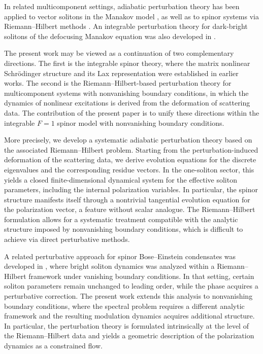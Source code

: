 \documentclass[11pt]{amsart}
\theoremstyle{definition}
\numberwithin{equation}{section}
\begin{document}
In related multicomponent settings, adiabatic perturbation theory has been applied to vector solitons in the Manakov model \cite{Chernyavskiy2025,PhysRevA.109.023328}, as well as to spinor systems via Riemann--Hilbert methods \cite{Rothos2024}. An integrable perturbation theory for dark-bright solitons of the defocusing Manakov equation was also developed in \cite{MylonasRothosKevrekidisFrantzeskakis2016}.

The present work may be viewed as a continuation of two complementary directions. The first is the integrable spinor theory, where the matrix nonlinear Schr\"odinger structure and its Lax representation were established in earlier works. The second is the Riemann--Hilbert-based perturbation theory for multicomponent systems with nonvanishing boundary conditions, in which the dynamics of nonlinear excitations is derived from the deformation of scattering data. The contribution of the present paper is to unify these directions within the integrable $F=1$ spinor model with nonvanishing boundary conditions.

More precisely, we develop a systematic adiabatic perturbation theory based on the associated Riemann--Hilbert problem. Starting from the perturbation-induced deformation of the scattering data, we derive evolution equations for the discrete eigenvalues and the corresponding residue vectors. In the one-soliton sector, this yields a closed finite-dimensional dynamical system for the effective soliton parameters, including the internal polarization variables. In particular, the spinor structure manifests itself through a nontrivial tangential evolution equation for the polarization vector, a feature without scalar analogue. The Riemann--Hilbert formulation allows for a systematic treatment compatible with the analytic structure imposed by nonvanishing boundary conditions, which is difficult to achieve via direct perturbative methods.

A related perturbative approach for spinor Bose--Einstein condensates was developed in \cite{Doktorov2008}, where bright soliton dynamics was analyzed within a Riemann--Hilbert framework under vanishing boundary conditions. In that setting, certain soliton parameters remain unchanged to leading order, while the phase acquires a perturbative correction. The present work extends this analysis to nonvanishing boundary conditions, where the spectral problem requires a different analytic framework and the resulting modulation dynamics acquires additional structure. In particular, the perturbation theory is formulated intrinsically at the level of the Riemann--Hilbert data and yields a geometric description of the polarization dynamics as a constrained flow.
\end{document}
